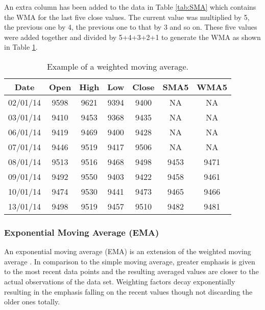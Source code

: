 An extra column has been added to the data in Table \ref{tab:SMA} which contains the WMA for the last five close values. The current value was multiplied by 5, the previous one by 4, the previous one to that by 3 and so on. These five values were added together and divided by 5+4+3+2+1 to generate the WMA as shown in Table \ref{tab:WMA}.

\begin{table}[htbp]
  \centering
  \caption[Example of a Weighted Moving Average]{Example of a weighted moving average.}
    \begin{tabular}{ccccccc}
    \toprule
    \textbf{Date} & \textbf{Open} & \textbf{High} & \textbf{Low} & \textbf{Close} & \textbf{SMA5} & \textbf{WMA5} \\
    \midrule
    02/01/14 & 9598  & 9621  & 9394  & 9400  &  NA   & NA  \\
    03/01/14 & 9410  & 9453  & 9368  & 9435  &  NA   & NA \\
    06/01/14 & 9419  & 9469  & 9400  & 9428  &  NA   & NA \\
    07/01/14 & 9446  & 9519  & 9417  & 9506  &  NA   & NA \\
    08/01/14 & 9513  & 9516  & 9468  & 9498  & 9453  & 9471 \\
    09/01/14 & 9492  & 9550  & 9403  & 9422  & 9458  & 9461 \\
    10/01/14 & 9474  & 9530  & 9441  & 9473  & 9465  & 9466 \\
    13/01/14 & 9498  & 9519  & 9457  & 9510  & 9482  & 9481 \\
    \bottomrule
    \end{tabular}%
  \label{tab:WMA}%
\end{table}%

\subsubsection{Exponential Moving Average (EMA)}
An exponential moving average (EMA) is an extension of the weighted moving average \citep{Ord20041}. In comparison to the simple moving average, greater emphasis is given to the most recent data points and the resulting averaged values are closer to the actual observations of the data set. Weighting factors decay exponentially resulting in the emphasis falling on the recent values though not discarding the older ones totally. 

